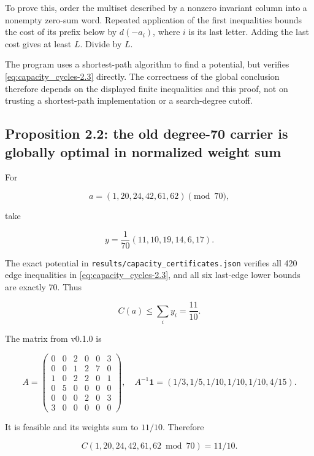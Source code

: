To prove this, order the multiset described by a nonzero invariant
column into a nonempty zero-sum word. Repeated application of the first
inequalities bounds the cost of its prefix below by \(d(-a_i)\), where
\(i\) is its last letter. Adding the last cost gives at least \(L\).
Divide by \(L\).

The program uses a shortest-path algorithm to find a potential, but
verifies \eqref{eq:capacity_cycles-2.3} directly. The correctness of the global conclusion
therefore depends on the displayed finite inequalities and this proof,
not on trusting a shortest-path implementation or a search-degree
cutoff.

\hypertarget{capacity_cycles-proposition-2.2-the-old-degree-70-carrier-is-globally-optimal-in-normalized-weight-sum}{%
\subsection{Proposition 2.2: the old degree-70 carrier is globally
optimal in normalized weight
sum}\label{capacity_cycles-proposition-2.2-the-old-degree-70-carrier-is-globally-optimal-in-normalized-weight-sum}}

For

\[
a=(1,20,24,42,61,62)\pmod{70},
\]

take

\begin{equation}\label{eq:capacity_cycles-2.4}
y=\frac1{70}(11,10,19,14,6,17).\end{equation}

The exact potential in \texttt{results/capacity\_certificates.json}
verifies all 420 edge inequalities in \eqref{eq:capacity_cycles-2.3}, and all six last-edge lower
bounds are exactly 70. Thus

\[
C(a)\le\sum_i y_i=\frac{11}{10}.
\]

The matrix from v0.1.0 is

\[
A=\begin{pmatrix}
0&0&2&0&0&3\\
0&0&1&2&7&0\\
1&0&2&2&0&1\\
0&5&0&0&0&0\\
0&0&0&2&0&3\\
3&0&0&0&0&0
\end{pmatrix},
\quad
A^{-1}\mathbf1=(1/3,1/5,1/10,1/10,1/10,4/15).
\]

It is feasible and its weights sum to \(11/10\). Therefore

\begin{equation}\label{eq:capacity_cycles-2.5}
\boxed{C(1,20,24,42,61,62\bmod70)=11/10.}\end{equation}

